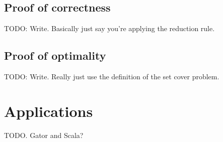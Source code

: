 \documentclass{article}
\begin{document}
\subsection{Proof of correctness}
TODO: Write. Basically just say you're applying the reduction rule.

\subsection{Proof of optimality}
TODO: Write. Really just use the definition of the set cover problem.

\section{Applications}

TODO. Gator and Scala?
\end{document}
